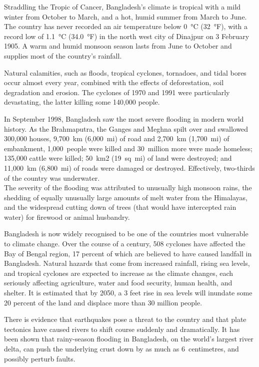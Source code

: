 Straddling the Tropic of Cancer, Bangladesh's climate is tropical with a
mild winter from October to March, and a hot, humid summer from March to
June. The country has never recorded an air temperature below 0~°C
(32~°F), with a record low of 1.1~°C (34.0~°F) in the north west city of
Dinajpur on 3 February 1905. A warm and humid monsoon season lasts from
June to October and supplies most of the country's rainfall.

Natural calamities, such as floods, tropical cyclones, tornadoes, and
tidal bores occur almost every year, combined with the effects of
deforestation, soil degradation and erosion. The cyclones of 1970 and
1991 were particularly devastating, the latter killing some 140,000
people.

In September 1998, Bangladesh saw the most severe flooding in modern
world history. As the Brahmaputra, the Ganges and Meghna spilt over and
swallowed 300,000 houses, 9,700~km (6,000~mi) of road and 2,700~km
(1,700~mi) of embankment, 1,000~people were killed and 30~million more
were made homeless; 135,000 cattle were killed; 50~km2 (19~sq~mi) of
land were destroyed; and 11,000~km (6,800~mi) of roads were damaged or
destroyed. Effectively, two-thirds of the country was underwater.\\
The severity of the flooding was attributed to unusually high monsoon
rains, the shedding of equally unusually large amounts of melt water
from the Himalayas, and the widespread cutting down of trees (that would
have intercepted rain water) for firewood or animal husbandry.

Bangladesh is now widely recognised to be one of the countries most
vulnerable to climate change. Over the course of a century, 508 cyclones
have affected the Bay of Bengal region, 17 percent of which are believed
to have caused landfall in Bangladesh. Natural hazards that come from
increased rainfall, rising sea levels, and tropical cyclones are
expected to increase as the climate changes, each seriously affecting
agriculture, water and food security, human health, and shelter. It is
estimated that by 2050, a 3 feet rise in sea levels will inundate some
20 percent of the land and displace more than 30 million people.

There is evidence that earthquakes pose a threat to the country and that
plate tectonics have caused rivers to shift course suddenly and
dramatically. It has been shown that rainy-season flooding in
Bangladesh, on the world's largest river delta, can push the underlying
crust down by as much as 6~centimetres, and possibly perturb faults.

